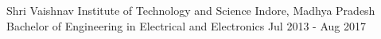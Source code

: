 \documentclass{my_resume}
\begin{document}
	\begin{cventries}
		\cventryedu
			{Shri Vaishnav Institute of Technology and Science} %
			{Indore, Madhya Pradesh} %
			{Bachelor of Engineering in Electrical and Electronics} %
			{Jul 2013 - Aug 2017} %
	\end{cventries}
\end{document}
